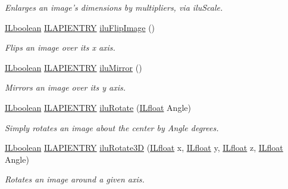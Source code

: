\begin{DoxyCompactItemize}
\begin{DoxyCompactList}\small\item\em Enlarges an image's dimensions by multipliers, via ilu\+Scale. \end{DoxyCompactList}\item 
\hyperlink{group__il__types_gaa6aa7c95cfdc06b4d8601ef832b7bb0a}{I\+Lboolean} \hyperlink{_i_l_8h_a69c08a8d06df986f7e46f209d131ef2f}{I\+L\+A\+P\+I\+E\+N\+T\+R\+Y} \hyperlink{group__ilu__geometry_ga102b4491bacd9ac35795351150f6afa1}{ilu\+Flip\+Image} ()
\begin{DoxyCompactList}\small\item\em Flips an image over its x axis. \end{DoxyCompactList}\item 
\hyperlink{group__il__types_gaa6aa7c95cfdc06b4d8601ef832b7bb0a}{I\+Lboolean} \hyperlink{_i_l_8h_a69c08a8d06df986f7e46f209d131ef2f}{I\+L\+A\+P\+I\+E\+N\+T\+R\+Y} \hyperlink{group__ilu__geometry_ga34ba55cb258ff33ab1e987a893a83c3c}{ilu\+Mirror} ()
\begin{DoxyCompactList}\small\item\em Mirrors an image over its y axis. \end{DoxyCompactList}\item 
\hyperlink{group__il__types_gaa6aa7c95cfdc06b4d8601ef832b7bb0a}{I\+Lboolean} \hyperlink{_i_l_8h_a69c08a8d06df986f7e46f209d131ef2f}{I\+L\+A\+P\+I\+E\+N\+T\+R\+Y} \hyperlink{group__ilu__geometry_gacc794d0e5a6951bb801fb9b278d63215}{ilu\+Rotate} (\hyperlink{group__il__types_ga376156c9461893f4b1a5de9579dc86f2}{I\+Lfloat} Angle)
\begin{DoxyCompactList}\small\item\em Simply rotates an image about the center by {\itshape Angle} degrees. \end{DoxyCompactList}\item 
\hyperlink{group__il__types_gaa6aa7c95cfdc06b4d8601ef832b7bb0a}{I\+Lboolean} \hyperlink{_i_l_8h_a69c08a8d06df986f7e46f209d131ef2f}{I\+L\+A\+P\+I\+E\+N\+T\+R\+Y} \hyperlink{group__ilu__geometry_gab62dd0f340a7f55455ab4c5a92747f2d}{ilu\+Rotate3\+D} (\hyperlink{group__il__types_ga376156c9461893f4b1a5de9579dc86f2}{I\+Lfloat} x, \hyperlink{group__il__types_ga376156c9461893f4b1a5de9579dc86f2}{I\+Lfloat} y, \hyperlink{group__il__types_ga376156c9461893f4b1a5de9579dc86f2}{I\+Lfloat} z, \hyperlink{group__il__types_ga376156c9461893f4b1a5de9579dc86f2}{I\+Lfloat} Angle)
\begin{DoxyCompactList}\small\item\em Rotates an image around a given axis. \end{DoxyCompactList}\item 

\end{DoxyCompactItemize}
